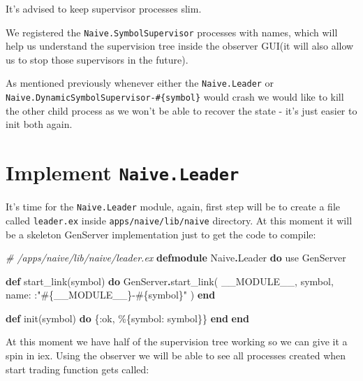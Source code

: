\documentclass[
]{book}
\newenvironment{Shaded}{\begin{snugshade}}{\end{snugshade}}
\newcommand{\CommentTok}[1]{\textcolor[rgb]{0.56,0.35,0.01}{\textit{#1}}}
\newcommand{\ConstantTok}[1]{\textcolor[rgb]{0.00,0.00,0.00}{#1}}
\newcommand{\ImportTok}[1]{#1}
\newcommand{\KeywordTok}[1]{\textcolor[rgb]{0.13,0.29,0.53}{\textbf{#1}}}
\newcommand{\NormalTok}[1]{#1}
\newcommand{\OperatorTok}[1]{\textcolor[rgb]{0.81,0.36,0.00}{\textbf{#1}}}
\newcommand{\OtherTok}[1]{\textcolor[rgb]{0.56,0.35,0.01}{#1}}
\newcommand{\StringTok}[1]{\textcolor[rgb]{0.31,0.60,0.02}{#1}}
\newcommand{\VariableTok}[1]{\textcolor[rgb]{0.00,0.00,0.00}{#1}}
\begin{document}
It's advised to keep supervisor processes slim.

We registered the \texttt{Naive.SymbolSupervisor} processes with names, which will help us understand the supervision tree inside the observer GUI(it will also allow us to stop those supervisors in the future).

As mentioned previously whenever either the \texttt{Naive.Leader} or \texttt{Naive.DynamicSymbolSupervisor-\#\{symbol\}} would crash we would like to kill the other child process as we won't be able to recover the state - it's just easier to init both again.

\hypertarget{implement-naive.leader}{%
\section{\texorpdfstring{Implement \texttt{Naive.Leader}}{Implement Naive.Leader}}\label{implement-naive.leader}}

It's time for the \texttt{Naive.Leader} module, again, first step will be to create a file called \texttt{leader.ex} inside \texttt{apps/naive/lib/naive} directory. At this moment it will be a skeleton GenServer implementation just to get the code to compile:

\begin{Shaded}
\begin{Highlighting}[]
\CommentTok{\# /apps/naive/lib/naive/leader.ex}
\KeywordTok{defmodule} \ConstantTok{Naive}\OperatorTok{.}\ConstantTok{Leader} \KeywordTok{do}
  \ImportTok{use} \ConstantTok{GenServer}

  \KeywordTok{def}\NormalTok{ start\_link(symbol) }\KeywordTok{do}
    \ConstantTok{GenServer}\OperatorTok{.}\NormalTok{start\_link(}
      \ConstantTok{\_\_MODULE\_\_}\NormalTok{,}
\NormalTok{      symbol,}
      \VariableTok{name:}\NormalTok{ :}\StringTok{"}\OtherTok{\#\{}\ConstantTok{\_\_MODULE\_\_}\OtherTok{\}}\StringTok{{-}}\OtherTok{\#\{}\NormalTok{symbol}\OtherTok{\}}\StringTok{"}
\NormalTok{    )}
  \KeywordTok{end}

  \KeywordTok{def}\NormalTok{ init(symbol) }\KeywordTok{do}
\NormalTok{    \{}\VariableTok{:ok}\NormalTok{, \%\{}\VariableTok{symbol:}\NormalTok{ symbol\}\}}
  \KeywordTok{end}
\KeywordTok{end}
\end{Highlighting}
\end{Shaded}

At this moment we have half of the supervision tree working so we can give it
a spin in iex. Using the observer we will be able to see all processes created when start trading function gets called:
\end{document}
